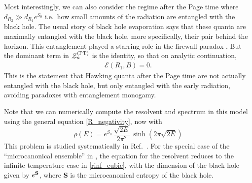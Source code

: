 \documentclass[a4paper,11pt]{article}
\newcommand{\be}{\begin{equation}}
\newcommand{\ee}{\end{equation}}
\newcommand\sZ{{\mathcal Z}}
\begin{document}
\begin{enumerate}
\begin{appendix}
Most interestingly, we can also consider the regime after the Page time where $d_{R_2} \gg d_{R_1}e^{S_0}$ i.e.~how small amounts of the radiation are entangled with the black hole. The usual story of black hole evaporation says that these quanta are maximally entangled with the black hole, more specifically, their pair behind the horizon. This entanglement played a starring role in the firewall paradox \cite{2013JHEP...02..062A}. But the dominant term in $\sZ_n^{\rm (PT)}$ is the identity, so that on analytic continuation, 
\begin{align}
 \mathcal{E}(R_1, B) = 0.
\end{align}
This is the statement that Hawking quanta after the Page time are not actually entangled with the black hole, but only entangled with the early radiation, avoiding paradoxes with entanglement monogamy. 

Note that we can numerically compute the resolvent and spectrum in this model using the general equation \eqref{R_negativity}, now with 
\be 
\rho (E) = e^{S_0} \, \frac{\sqrt{2E}}{2\pi^2} \, \sinh (2 \pi \sqrt{2E})
\ee
This problem is studied systematically in Ref.~\cite{2021arXiv211011947D}. For the special case of the ``microcanonical ensemble'' in \cite{2019arXiv191111977P}, the equation for the resolvent reduces to the infinite temperature case in \eqref{rinf_cubic}, with the dimension of the black hole given by $e^{\bf S}$, where {\bf S} is the microcanonical entropy of the black hole. 







\end{appendix}
\end{enumerate}
\end{document}
